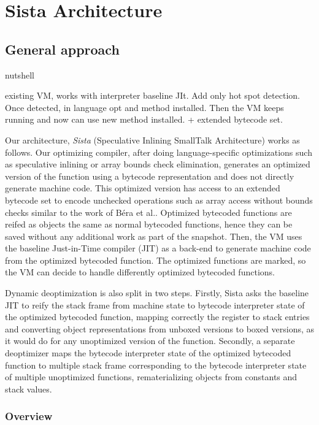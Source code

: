 \documentclass[a4paper,12pt,twoside]{../includes/ThesisStyle}
\begin{document}
\fi

\chapter{Sista Architecture}
\label{chap:architecture}
\minitoc

\section{General approach}

nutshell

existing VM, works with interpreter baseline JIt. Add only hot spot detection. Once detected, in language opt and method installed. Then the VM keeps running and now can use new method installed. + extended bytecode set.

Our architecture, \emph{Sista} (Speculative Inlining SmallTalk Architecture) works as follows. Our optimizing compiler, after doing language-specific optimizations such as speculative inlining or array bounds check elimination, generates an optimized version of the function using a bytecode representation and does not directly generate machine code. This optimized version has access to an extended bytecode set to encode unchecked operations such as array access without bounds checks similar to the work of B\'era et al.\cite{Bera14a}. Optimized bytecoded functions are reifed as objects the same as normal bytecoded functions, hence they can be saved without any additional work as part of the snapshot. Then, the VM uses the baseline Just-in-Time compiler (JIT) as a back-end to generate machine code from the optimized bytecoded function. The optimized functions are marked, so the VM can decide to handle differently optimized bytecoded functions. 

Dynamic deoptimization is also split in two steps. Firstly, Sista asks the baseline JIT to reify the stack frame from machine state to bytecode interpreter state of the optimized bytecoded function, mapping correctly the register to stack entries and converting object representations from unboxed versions to boxed versions, as it would do for any unoptimized version of the function. Secondly, a separate deoptimizer maps the bytecode interpreter state of the optimized bytecoded function to multiple stack frame corresponding to the bytecode interpreter state of multiple unoptimized functions, rematerializing objects from constants and stack values.

\subsection{Overview}
\end{document}
